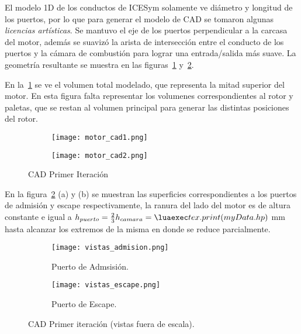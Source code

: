 El modelo 1D de los conductos de ICESym solamente ve diámetro y longitud  de los
puertos, por lo que para generar el modelo de CAD se tomaron algunas
\emph{licencias artísticas}.
%
Se mantuvo el eje de los puertos perpendicular a la carcasa del motor, además se
suavizó la arista de intersección entre el conducto de los puertos y la cámara
de combustión para lograr una entrada/salida más suave.
%
La geometría resultante se muestra en las figuras~\ref{fig:motor_cad1}
y~\ref{fig:motor_cad2}.

En la~\ref{fig:motor_cad1} se ve el volumen total modelado, que representa la
mitad superior del motor.
%
En esta figura falta representar los volumenes correspondientes al rotor y
paletas, que se restan al volumen principal para generar las distintas
posiciones del rotor.


\begin{figure}
  \centering
    \begin{subfigure}{0.4\textwidth}
        \centering
        \texttt{[image: motor\_cad1.png]}
    \end{subfigure}
    \begin{subfigure}{0.4\textwidth}
        \centering
        \texttt{[image: motor\_cad2.png]}
    \end{subfigure}
  \caption{CAD Primer Iteración}\label{fig:motor_cad1}
\end{figure}

En la figura~\ref{fig:motor_cad2} (a) y (b) se muestran las superficies
correspondientes a los puertos de admisión y escape respectivamente, la ranura
del lado del motor es de altura constante e igual a $h_{puerto} = \frac{2}{3}
h_{camara} = \lua{tex.print(myData.hp)}$ mm hasta alcanzar los extremos de la
misma en donde se reduce parcialmente.

\begin{figure}
  \centering
    \begin{subfigure}{0.8\textwidth}
        \centering
        \texttt{[image: vistas\_admision.png]}
        \caption{Puerto de Admsisión.}
    \end{subfigure}
    \begin{subfigure}{0.8\textwidth}
        \centering
        \texttt{[image: vistas\_escape.png]}
        \caption{Puerto de Escape.}
    \end{subfigure}
  \caption{CAD Primer iteración (vistas fuera de escala).}\label{fig:motor_cad2}
\end{figure}
